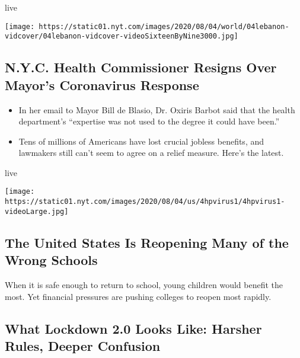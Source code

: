 live

\texttt{[image: https://static01.nyt.com/images/2020/08/04/world/04lebanon-vidcover/04lebanon-vidcover-videoSixteenByNine3000.jpg]}

\href{/2020/08/04/world/coronavirus-cases.html}{}

\hypertarget{nyc-health-commissioner-resigns-over-mayors-coronavirus-response}{%
\subsection{N.Y.C. Health Commissioner Resigns Over Mayor's Coronavirus
Response}\label{nyc-health-commissioner-resigns-over-mayors-coronavirus-response}}

\begin{itemize}
\tightlist
\item
  In her email to Mayor Bill de Blasio, Dr. Oxiris Barbot said that the
  health department's ``expertise was not used to the degree it could
  have been.''
\item
  Tens of millions of Americans have lost crucial jobless benefits, and
  lawmakers still can't seem to agree on a relief measure. Here's the
  latest.
\end{itemize}

live

\texttt{[image: https://static01.nyt.com/images/2020/08/04/us/4hpvirus1/4hpvirus1-videoLarge.jpg]}

\href{/2020/08/03/business/how-schools-reopen.html}{}

\hypertarget{the-united-states-is-reopening-many-of-the-wrong-schools}{%
\subsection{The United States Is Reopening Many of the Wrong
Schools}\label{the-united-states-is-reopening-many-of-the-wrong-schools}}

When it is safe enough to return to school, young children would benefit
the most. Yet financial pressures are pushing colleges to reopen most
rapidly.

\href{/2020/08/04/world/australia/coronavirus-melbourne-lockdown.html}{}

\hypertarget{what-lockdown-20-looks-like-harsher-rules-deeper-confusion}{%
\subsection{What Lockdown 2.0 Looks Like: Harsher Rules, Deeper
Confusion}\label{what-lockdown-20-looks-like-harsher-rules-deeper-confusion}}

